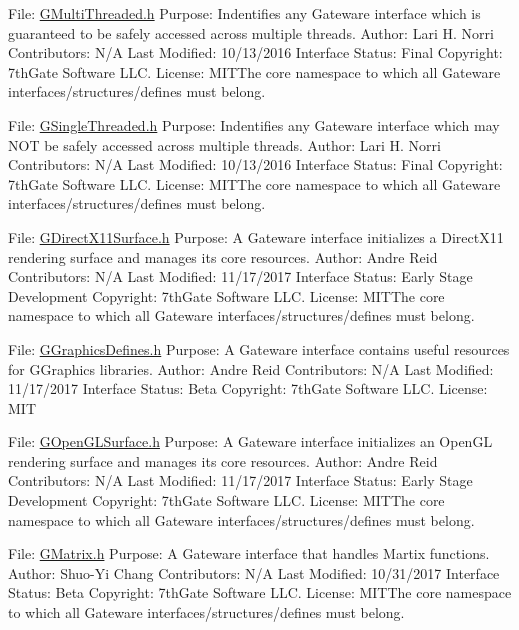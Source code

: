 File\+: \hyperlink{GMultiThreaded_8h_source}{G\+Multi\+Threaded.\+h} Purpose\+: Indentifies any Gateware interface which is guaranteed to be safely accessed across multiple threads. Author\+: Lari H. Norri Contributors\+: N/A Last Modified\+: 10/13/2016 Interface Status\+: Final Copyright\+: 7th\+Gate Software L\+LC. License\+: M\+I\+T\+The core namespace to which all Gateware interfaces/structures/defines must belong.

File\+: \hyperlink{GSingleThreaded_8h_source}{G\+Single\+Threaded.\+h} Purpose\+: Indentifies any Gateware interface which may N\+OT be safely accessed across multiple threads. Author\+: Lari H. Norri Contributors\+: N/A Last Modified\+: 10/13/2016 Interface Status\+: Final Copyright\+: 7th\+Gate Software L\+LC. License\+: M\+I\+T\+The core namespace to which all Gateware interfaces/structures/defines must belong.

File\+: \hyperlink{GDirectX11Surface_8h_source}{G\+Direct\+X11\+Surface.\+h} Purpose\+: A Gateware interface initializes a Direct\+X11 rendering surface and manages it\textquotesingle{}s core resources. Author\+: Andre Reid Contributors\+: N/A Last Modified\+: 11/17/2017 Interface Status\+: Early Stage Development Copyright\+: 7th\+Gate Software L\+LC. License\+: M\+I\+T\+The core namespace to which all Gateware interfaces/structures/defines must belong.

File\+: \hyperlink{GGraphicsDefines_8h_source}{G\+Graphics\+Defines.\+h} Purpose\+: A Gateware interface contains useful resources for G\+Graphics libraries. Author\+: Andre Reid Contributors\+: N/A Last Modified\+: 11/17/2017 Interface Status\+: Beta Copyright\+: 7th\+Gate Software L\+LC. License\+: M\+IT

File\+: \hyperlink{GOpenGLSurface_8h_source}{G\+Open\+G\+L\+Surface.\+h} Purpose\+: A Gateware interface initializes an Open\+GL rendering surface and manages it\textquotesingle{}s core resources. Author\+: Andre Reid Contributors\+: N/A Last Modified\+: 11/17/2017 Interface Status\+: Early Stage Development Copyright\+: 7th\+Gate Software L\+LC. License\+: M\+I\+T\+The core namespace to which all Gateware interfaces/structures/defines must belong.

File\+: \hyperlink{GMatrix_8h_source}{G\+Matrix.\+h} Purpose\+: A Gateware interface that handles Martix functions. Author\+: Shuo-\/\+Yi Chang Contributors\+: N/A Last Modified\+: 10/31/2017 Interface Status\+: Beta Copyright\+: 7th\+Gate Software L\+LC. License\+: M\+I\+T\+The core namespace to which all Gateware interfaces/structures/defines must belong.

